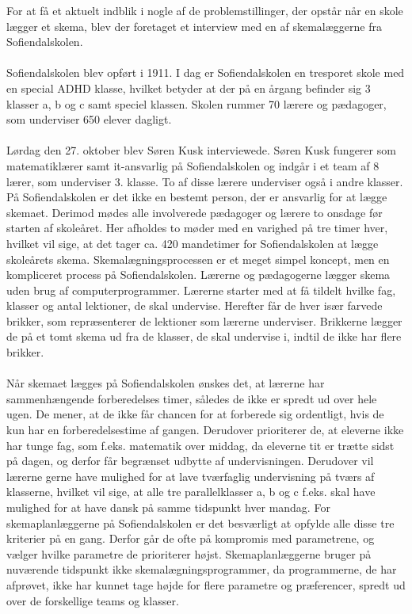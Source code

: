 For at få et aktuelt indblik i nogle af de problemstillinger, der opstår når en skole lægger et skema, blev der foretaget et interview med en af skemalæggerne fra Sofiendalskolen.
\\\\
Sofiendalskolen blev opført i 1911. I dag er Sofiendalskolen en tresporet skole med en special ADHD klasse, hvilket betyder at der på en årgang befinder sig 3 klasser a, b og c samt speciel klassen. Skolen rummer 70 lærere og pædagoger, som underviser 650 elever dagligt.
\\\\
Lørdag den 27. oktober blev Søren Kusk interviewede. Søren Kusk fungerer som matematiklærer samt it-ansvarlig på Sofiendalskolen og indgår i et team af 8 lærer, som underviser 3. klasse. To af disse lærere underviser også i andre klasser. På Sofiendalskolen er det ikke en bestemt person, der er ansvarlig for at lægge skemaet. Derimod mødes alle involverede pædagoger og lærere to onsdage før starten af skoleåret. Her afholdes to møder med en varighed på tre timer hver, hvilket vil sige, at det tager ca. 420 mandetimer for Sofiendalskolen at lægge skoleårets skema. Skemalægningsprocessen er et meget simpel koncept, men en kompliceret process på Sofiendalskolen. Lærerne og pædagogerne lægger skema uden brug af computerprogrammer. Lærerne starter med at få tildelt hvilke fag, klasser og antal lektioner, de skal undervise. Herefter får de hver især farvede brikker, som repræsenterer de lektioner som lærerne underviser. Brikkerne lægger de på et tomt skema ud fra de klasser, de skal undervise i, indtil de ikke har flere brikker.
\\\\
Når skemaet lægges på Sofiendalskolen ønskes det, at lærerne har sammenhængende forberedelses timer, således de ikke er spredt ud over hele ugen. De mener, at de ikke får chancen for at forberede sig ordentligt, hvis de kun har en forberedelsestime af gangen. Derudover prioriterer de, at eleverne ikke har tunge fag, som f.eks. matematik over middag, da eleverne tit er trætte sidst på dagen, og derfor får begrænset udbytte af undervisningen. Derudover vil lærerne gerne have mulighed for at lave tværfaglig undervisning på tværs af klasserne, hvilket vil sige, at alle tre parallelklasser a, b og c f.eks. skal have mulighed for at have dansk på samme tidspunkt hver mandag. For skemaplanlæggerne på Sofiendalskolen er det besværligt at opfylde alle disse tre kriterier på en gang. Derfor går de ofte på kompromis med parametrene, og vælger hvilke parametre de prioriterer højst. Skemaplanlæggerne bruger på nuværende tidspunkt ikke skemalægningsprogrammer, da programmerne, de har afprøvet, ikke har kunnet tage højde for flere parametre og præferencer, spredt ud over de forskellige teams og klasser.
